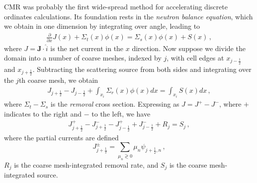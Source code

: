 CMR was probably the first wide-spread method for accelerating discrete 
ordinates calculations.  Its foundation rests in the \textit{neutron balance 
equation}, which we obtain in one dimension by integrating
 over angle, leading to
\begin{equation}
\begin{split}
 \frac{\partial }{\partial x}J(x) + \Sigma_t(x) \phi(x) 
   = \Sigma_{s}(x)\phi(x) + S(x) \, ,
\end{split}
\label{eq:balance}
\end{equation}
where $J = \mathbf{J}\cdot \hat{i}$ is the net current in the $x$ direction. Now 
suppose we divide the domain into a number of coarse meshes, indexed by $j$, 
with cell edges at $x_{j-\frac{1}{2}}$ and $x_{j+\frac{1}{2}}$.  Subtracting the 
scattering source from both sides and integrating over the $j$th coarse mesh, we 
obtain
\begin{equation}
\begin{split}
 J_{j+\frac{1}{2}} - J_{j-\frac{1}{2}}  + \int_{x_i} \Sigma_r(x) \phi(x) dx = 
\int_{x_i} S(x) dx \, ,
\end{split}
\label{eq:coarsebalance}
\end{equation}
where $\Sigma_t - \Sigma_s$ is the \textit{removal} cross section.
Expressing  as $J = J^+ - J^-$, where $+$ indicates to 
the right and $-$ to the left, we have
\begin{equation}
\begin{split}
 J^+_{j+\frac{1}{2}}- J^-_{j+\frac{1}{2}} - J^+_{j-\frac{1}{2}} + 
J^-_{j-\frac{1}{2}} + R_j = S_j \, ,
\end{split}
\label{eq:cmrbalance}
\end{equation}
where the partial currents are defined
\begin{equation}
 J^{\pm}_{j+\frac{1}{2}} = \sum_{\mu_n \gtrless 0} \mu_n \psi_{j+\frac{1}{2},n} 
\, ,
\end{equation}
$R_j$ is the coarse mesh-integrated removal rate, and $S_j$ is the coarse 
mesh-integrated source.  

